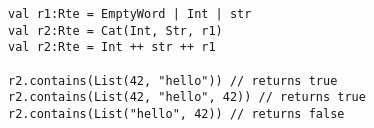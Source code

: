 \begin{lstlisting}[style=scalaioScala]
val r1:Rte = EmptyWord | Int | str
val r2:Rte = Cat(Int, Str, r1)
val r2:Rte = Int ++ str ++ r1

r2.contains(List(42, "hello")) // returns true
r2.contains(List(42, "hello", 42)) // returns true
r2.contains(List("hello", 42)) // returns false
\end{lstlisting}
